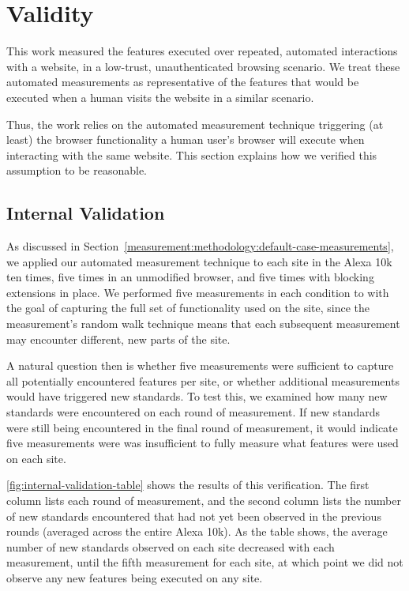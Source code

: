 \section{Validity}
\label{measurement:validity}

This work measured the features executed over repeated, automated interactions
with a website, in a low-trust, unauthenticated browsing scenario.  We treat
these automated measurements as representative of the features that would be
executed when a human visits the website in a similar scenario.

Thus, the work relies on the automated measurement technique
triggering (at least) the browser functionality a human user's browser will
execute when interacting with the same website. This section explains how we
verified this assumption to be reasonable.


\subsection{Internal Validation}
\label{measurement:validity:internal-validation}

As discussed in
Section~\ref{measurement:methodology:default-case-measurements}, we applied our
automated measurement technique to each site in the Alexa 10k ten times, five
times in an unmodified browser, and five times with blocking extensions in
place.  We performed five measurements in each condition to with the goal of
capturing the full set of functionality used on the site, since the
measurement's random walk technique means that each subsequent measurement may
encounter different, new parts of the site.

A natural question then is whether five measurements were sufficient to capture
all potentially encountered features per site, or whether additional
measurements would have triggered new standards.  To test this, we examined how
many new standards were encountered on each round of measurement.  If new
standards were still being encountered in the final round of measurement, it
would indicate five measurements were was insufficient to fully measure what
features were used on each site.

\ref{fig:internal-validation-table} shows the results of this verification.
The first column lists each round of measurement, and the second column lists
the number of new standards encountered that had not yet been observed in the
previous rounds (averaged across the entire Alexa 10k).  As the table shows,
the average number of new standards observed on each site decreased with each
measurement, until the fifth measurement for each site, at which point we did
not observe any new features being executed on any site.


